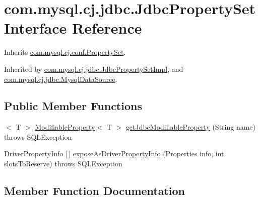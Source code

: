 \hypertarget{interfacecom_1_1mysql_1_1cj_1_1jdbc_1_1_jdbc_property_set}{}\section{com.\+mysql.\+cj.\+jdbc.\+Jdbc\+Property\+Set Interface Reference}
\label{interfacecom_1_1mysql_1_1cj_1_1jdbc_1_1_jdbc_property_set}


Inherits \mbox{\hyperlink{interfacecom_1_1mysql_1_1cj_1_1conf_1_1_property_set}{com.\+mysql.\+cj.\+conf.\+Property\+Set}}.



Inherited by \mbox{\hyperlink{classcom_1_1mysql_1_1cj_1_1jdbc_1_1_jdbc_property_set_impl}{com.\+mysql.\+cj.\+jdbc.\+Jdbc\+Property\+Set\+Impl}}, and \mbox{\hyperlink{classcom_1_1mysql_1_1cj_1_1jdbc_1_1_mysql_data_source}{com.\+mysql.\+cj.\+jdbc.\+Mysql\+Data\+Source}}.

\subsection*{Public Member Functions}
\begin{DoxyCompactItemize}
\item 
$<$ T $>$ \mbox{\hyperlink{interfacecom_1_1mysql_1_1cj_1_1conf_1_1_modifiable_property}{Modifiable\+Property}}$<$ T $>$ \mbox{\hyperlink{interfacecom_1_1mysql_1_1cj_1_1jdbc_1_1_jdbc_property_set_ab32dd5fed2dd7e715e1d95b0dbc4f587}{get\+Jdbc\+Modifiable\+Property}} (String name)  throws S\+Q\+L\+Exception
\item 
Driver\+Property\+Info \mbox{[}$\,$\mbox{]} \mbox{\hyperlink{interfacecom_1_1mysql_1_1cj_1_1jdbc_1_1_jdbc_property_set_a3d74db3873b64c6ed704a443e9993359}{expose\+As\+Driver\+Property\+Info}} (Properties info, int slots\+To\+Reserve)  throws S\+Q\+L\+Exception
\end{DoxyCompactItemize}


\subsection{Member Function Documentation}
\mbox{\label{interfacecom_1_1mysql_1_1cj_1_1jdbc_1_1_jdbc_property_set_a3d74db3873b64c6ed704a443e9993359}} 
